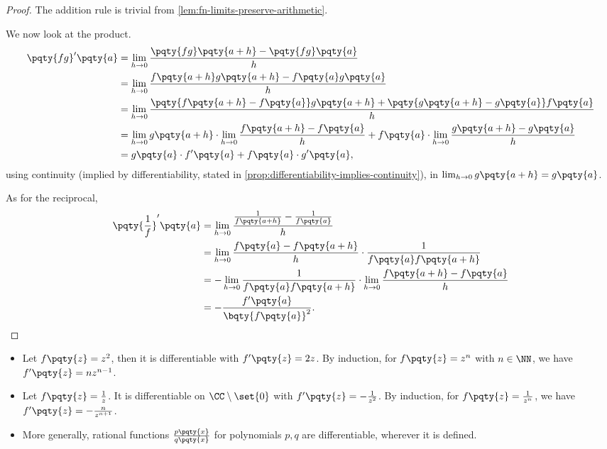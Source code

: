 \begin{proof}
    The addition rule is trivial from \autoref{lem:fn-limits-preserve-arithmetic}.

    We now look at the product.
    \begin{align*}
        \pqty{fg}'\pqty{a} &= \lim_{h \to 0} \frac{\pqty{fg}\pqty{a + h} - \pqty{fg}\pqty{a}}{h} \\
        &= \lim_{h \to 0} \frac{f\pqty{a + h} g\pqty{a + h} - f\pqty{a} g\pqty{a}}{h} \\
        &= \lim_{h \to 0} \frac{\pqty{f\pqty{a + h} - f\pqty{a}} g\pqty{a + h} + \pqty{g\pqty{a + h} - g\pqty{a}} f\pqty{a}}{h} \\
        &= \lim_{h \to 0} g\pqty{a + h} \cdot \lim_{h \to 0} \frac{f\pqty{a + h} - f\pqty{a}}{h} + f\pqty{a} \cdot \lim_{h \to 0} \frac{g\pqty{a + h} - g\pqty{a}}{h} \\
        &= g\pqty{a} \cdot f'\pqty{a} + f\pqty{a} \cdot g'\pqty{a},
    \end{align*}
    using continuity (implied by differentiability, stated in \autoref{prop:differentiability-implies-continuity}), in \(\lim_{h \to 0} g\pqty{a + h} = g\pqty{a}\).

    As for the reciprocal,
    \begin{align*}
        \pqty{\frac{1}{f}}'\pqty{a} &= \lim_{h \to 0} \frac{\frac{1}{f\pqty{a + h}} - \frac{1}{f\pqty{a}}}{h} \\
        &= \lim_{h \to 0} \frac{f\pqty{a} - f\pqty{a + h}}{h} \cdot \frac{1}{f\pqty{a} f\pqty{a + h}} \\
        &= - \lim_{h \to 0} \frac{1}{f\pqty{a} f\pqty{a + h}} \cdot \lim_{h \to 0} \frac{f\pqty{a + h} - f\pqty{a}}{h} \\
        &= - \frac{f'\pqty{a}}{\bqty{f\pqty{a}}^2}.
    \end{align*}
\end{proof}

\begin{examples}
    \label{ex:application-of-differentiation-rules}%
    \begin{itemize}
        \item Let \(f\pqty{z} = z^2\), then it is differentiable with \(f'\pqty{z} = 2z\). By induction, for \(f\pqty{z} = z^n\) with \(n \in \NN\), we have \(f'\pqty{z} = n z^{n - 1}\).
        \item Let \(f\pqty{z} = \frac{1}{z}\). It is differentiable on \(\CC \setminus\set{0}\) with \(f'\pqty{z} = -\frac{1}{z^2}\). By induction, for \(f\pqty{z} = \frac{1}{z^n}\), we have \(f'\pqty{z} = - \frac{n}{z^{n + 1}}\).
        \item More generally, rational functions \(\frac{p\pqty{x}}{q\pqty{x}}\) for polynomials \(p, q\) are differentiable, wherever it is defined.
    \end{itemize}
\end{examples}

